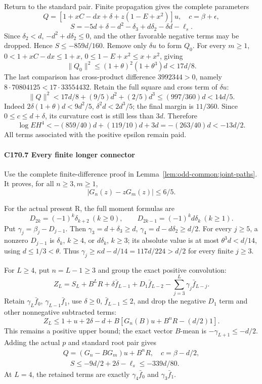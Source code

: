 Return to the standard pair. Finite propagation gives the complete parameters
\[
Q=[1+xC-dx+\delta+z(1-E+x^2)]u,\quad c=\beta+\epsilon,
\]
\[
S=-5d+\delta-d^2-\delta_3+d\delta_2-\delta d-\ell_s.
\tag{C170.T178.16}
\]
Since \(\delta_2<d\), \(-d^2+d\delta_2\le0\), and the other favorable negative terms may be dropped. Hence \(S\le-859d/160\). Remove only \(\delta u\) to form \(Q_0\). For every \(m\ge1\), \(0<1+xC-dx\le1+x\), \(0\le1-E+x^2\le x+x^2\), giving
\[
\|Q_0\|^2\le(1+\theta)^2(1+\theta^3)d<17d/8.
\]
The last comparison has cross-product difference \(3992344>0\), namely \(8\cdot70804125<17\cdot33554432\). Retain the full square and cross term of \(\delta u\):
\[
\|Q\|^2<17d/8+(9/5)d^2+(2/5)d^3
\le(997/360)d<14d/5.
\tag{C170.T178.17}
\]
Indeed \(2\delta(1+\theta)d<9d^2/5\), \(\delta^2d<2d^3/5\); the final margin is \(11/360\). Since \(0\le c\le d+\delta\), its curvature cost is still less than \(3d\). Therefore
\[
\log EH^4<-(859/40)d+(119/10)d+3d
=-(263/40)d<-13d/2.
\tag{C170.T178.18}
\]
All terms associated with the positive epsilon remain paid.

\paragraph{C170.7 Every finite longer connector}\label{part:C170.7}

Use the complete finite-difference proof in Lemma~\ref{lem:odd-common:joint-paths}. It proves, for all \(n\ge3,\allowbreak \allowbreak  m\ge1\),
\[
|G_n(z)-zG_m(z)|\le6/5.                              \tag{C170.T178.19}
\]


For the actual present R, the full moment formulas are
\[
D_{2k}=(-1)^k \delta_{k+2}\ (k\ge 0),\qquad
D_{2k-1}=(-1)^k d \delta_k\ (k\ge 1).
\]
Put \(\gamma_j=\beta_j-D_{j-1}\). Then \(\gamma_3=d+\delta_3\ge d\), \(\gamma_4=d-d\delta_2\ge d/2\). For every \(j\ge5\), a nonzero \(D_{j-1}\) is \(\delta_k\), \(k\ge4\), or \(d\delta_k\), \(k\ge3\); its absolute value is at most \(\theta^3d<d/14\), using \(d\le1/3<\theta\). Thus \(\gamma_j\ge\kappa d-d/14=117d/224>d/2\) for every finite \(j\ge3\).

For \(L\ge4\), put \(n=L-1\ge3\) and group the exact positive convolution:
\[
Z_L=S_L+B^LR+\delta \bar f_{L-1}+D_1\bar f_{L-2}
-\sum_{j=3}^L\gamma_j \bar f_{L-j}.
\]
Retain \(\gamma_L\bar f_0\), \(\gamma_{L-1}\bar f_1\), use \(\delta\ge0\), \(\bar f_{L-1}\le2\), and drop the negative \(D_1\) term and other nonnegative subtracted terms:
\[
Z_L\le1+u+2\delta-d+B[G_n(B)u+B^nR-(d/2)1].
\]
This remains a positive upper bound; the exact vector \(B\)-mean is \(-\gamma_{L+1}\le-d/2\). Adding the actual \(p\) and standard root pair gives
\[
\begin{gathered}
Q=(G_n-BG_m)u+B^nR,\quad c=\beta-d/2,\\
\quad S\le-9d/2+2\delta-\ell_s\le-339d/80.
\end{gathered}\tag{C170.T178.20}
\]
At \(L=4\), the retained terms are exactly \(\gamma_4\bar f_0\) and \(\gamma_3\bar f_1\).


